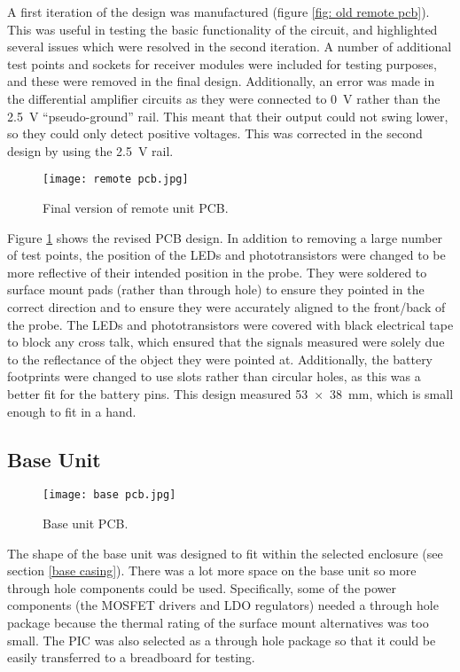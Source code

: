 A first iteration of the design was manufactured (figure \ref{fig: old remote pcb}). This was useful in testing the basic functionality of the circuit, and highlighted several issues which were resolved in the second iteration. A number of additional test points and sockets for receiver modules were included for testing purposes, and these were removed in the final design. Additionally, an error was made in the differential amplifier circuits as they were connected to \SI{0}{\volt} rather than the \SI{2.5}{\volt} ``pseudo-ground'' rail. This meant that their output could not swing lower, so they could only detect positive voltages. This was corrected in the second design by using the \SI{2.5}{\volt} rail.



\begin{figure}[htbp]
	\centering
	\texttt{[image: remote pcb.jpg]}
	\caption{Final version of remote unit PCB.}
	\label{fig: remote pcb}
\end{figure}

Figure \ref{fig: remote pcb} shows the revised PCB design. In addition to removing a large number of test points, the position of the LEDs and phototransistors were changed to be more reflective of their intended position in the probe. They were soldered to surface mount pads (rather than through hole) to ensure they pointed in the correct direction and to ensure they were accurately aligned to the front/back of the probe. The LEDs and phototransistors were covered with black electrical tape to block any cross talk, which ensured that the signals measured were solely due to the reflectance of the object they were pointed at. Additionally, the battery footprints were changed to use slots rather than circular holes, as this was a better fit for the battery pins. This design measured \SI{53x38}{\milli\metre}, which is small enough to fit in a hand.\\






\subsection{Base Unit}

\begin{figure}[htbp]
	\centering
	\texttt{[image: base pcb.jpg]}
	\caption{Base unit PCB.}
	\label{fig: base pcb}
\end{figure}

The shape of the base unit was designed to fit within the selected enclosure (see section \ref{base casing}). There was a lot more space on the base unit so more through hole components could be used. Specifically, some of the power components (the MOSFET drivers and LDO regulators) needed a through hole package because the thermal rating of the surface mount alternatives was too small. The PIC was also selected as a through hole package so that it could be easily transferred to a breadboard for testing.